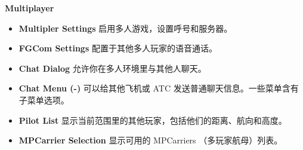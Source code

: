 \ifchinese
\item \textbf{Multiplayer}
 \begin{itemize}
  \item \textbf{Multipler Settings} 启用多人游戏，设置呼号和服务器。
  \item \textbf{FGCom Settings} 配置于其他多人玩家的语音通话。
  \item \textbf{Chat Dialog} 允许你在多人环境里与其他人聊天。
  \item \textbf{Chat Menu (-)} 可以给其他飞机或 ATC 发送普通聊天信息。一些菜单含有子菜单选项。
  \item \textbf{Pilot List} 显示当前范围里的其他玩家，包括他们的距离、航向和高度。
  \item \textbf{MPCarrier Selection} 显示可用的 MPCarriers （多玩家航母）列表。
  \end{itemize}
  \fi
\fi

